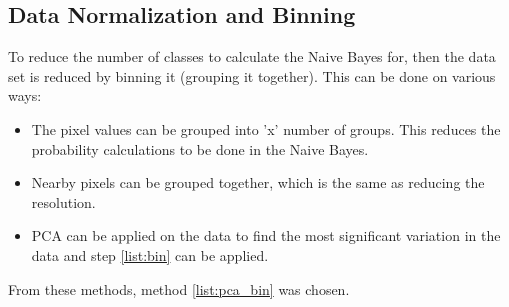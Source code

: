 \subsection{Data Normalization and Binning}
To reduce the number of classes to calculate the Naive Bayes for, then the data set is reduced by binning it (grouping it together).
This can be done on various ways:

\begin{itemize}
\item The pixel values can be grouped into 'x' number of groups.
This reduces the probability calculations to be done in the Naive Bayes. \label{list:bin}
\item Nearby pixels can be grouped together, which is the same as reducing the resolution.
\item PCA can be applied on the data to find the most significant variation in the data and step \ref{list:bin} can be applied. \label{list:pca_bin}
\end{itemize}

From these methods, method \ref{list:pca_bin} was chosen.
